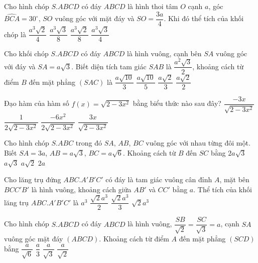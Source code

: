 \begin{ex}%
Cho hình chóp $S.ABCD$ có đáy $ABCD$ là hình thoi tâm $O$ cạnh $a$, góc $\widehat{BCA}=30^\circ$, $SO$ vuông góc với mặt đáy và $SO=\dfrac{3a}{4}$. Khi đó thể tích của khối chóp là
	\choice
	{$\dfrac{a^3\sqrt{2}}{4}$}
	{\True $\dfrac{a^3\sqrt{3}}{8}$}
	{$\dfrac{a^3\sqrt{2}}{8}$}
	{$\dfrac{a^3\sqrt{3}}{4}$}
\end{ex}
\begin{ex}%
Cho khối chóp $S.ABCD$ có đáy $ABCD$ là hình vuông, cạnh bên $SA$ vuông góc với đáy và $SA=a\sqrt{3}$. Biết diện tích tam giác $SAB$ là $\dfrac{a^2\sqrt{3}}{2}$, khoảng cách từ điểm $B$ đến mặt phẳng $(SAC)$ là
	\choice
	{$\dfrac{a\sqrt{10}}{3}$}
	{$\dfrac{a\sqrt{10}}{5}$}
	{$\dfrac{a\sqrt{2}}{3}$}
	{\True $\dfrac{a\sqrt{2}}{2}$}
\end{ex}
\begin{ex}%
Đạo hàm của hàm số $f(x)=\sqrt{2-3x^2}$ bằng biểu thức nào sau đây?
	\choice
	{\True $\dfrac{-3x}{\sqrt{2-3x^2}}$}
	{$\dfrac{1}{2\sqrt{2-3x^2}}$}
	{$\dfrac{-6x^2}{2\sqrt{2-3x^2}}$}
	{$\dfrac{3x}{\sqrt{2-3x^2}}$}
\end{ex}
\begin{ex}%
Cho hình chóp $S.ABC$ trong đó $SA$, $AB$, $BC$ vuông góc với nhau từng đôi một. Biết $SA=3a$, $AB=a\sqrt{3}$, $BC=a\sqrt{6}$. Khoảng cách từ $B$ đến $SC$ bằng
	\choice
	{$2a\sqrt{3}$}
	{$a\sqrt{3}$}
	{$a\sqrt{2}$}
	{\True $2a$}
\end{ex}
\begin{ex}%
Cho lăng trụ đứng $ABC.A'B'C'$ có đáy là tam giác vuông cân đỉnh $A$, mặt bên $BCC'B'$ là hình vuông, khoảng cách giữa $AB'$ và $CC'$ bằng $a$. Thể tích của khối lăng trụ $ABC.A'B'C'$ là
	\choice
	{$a^3$}
	{\True $\dfrac{\sqrt{2}a^3}{2}$}
	{$\dfrac{\sqrt{2}a^3}{3}$}
	{$\sqrt{2}a^3$}
\end{ex}
\begin{ex}%
Cho hình chóp $S.ABCD$ có đáy $ABCD$ là hình vuông, $\dfrac{SB}{\sqrt{2}}=\dfrac{SC}{\sqrt{3}}=a$, cạnh $SA$ vuông góc mặt đáy $(ABCD)$. Khoảng cách từ điểm $A$ đến mặt phẳng $(SCD)$ bằng
	\choice
	{$\dfrac{a}{\sqrt{6}}$}
	{$\dfrac{a}{3}$}
	{$\dfrac{a}{\sqrt{3}}$}
	{\True $\dfrac{a}{\sqrt{2}}$}
\end{ex}


